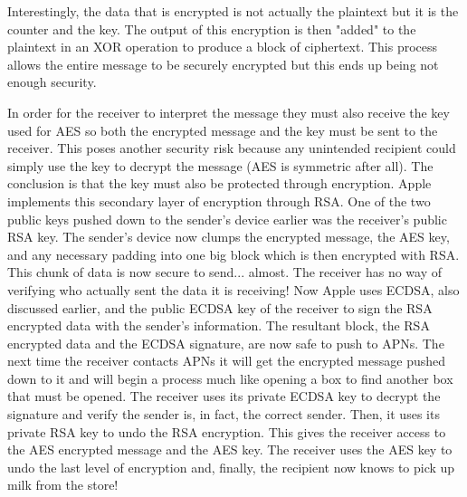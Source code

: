     Interestingly, the data that is encrypted is not actually the plaintext but it is the counter and the key.  The output of this encryption is then "added" to the plaintext in an XOR operation to produce a block of ciphertext.  This process allows the entire message to be securely encrypted but this ends up being not enough security.

    In order for the receiver to interpret the message they must also receive the key used for AES so both the encrypted message and the key must be sent to the receiver.  This poses another security risk because any unintended recipient could simply use the key to decrypt the message (AES is symmetric after all).  The conclusion is that the key must also be protected through encryption.  Apple implements this secondary layer of encryption through RSA.  One of the two public keys pushed down to the sender's device earlier was the receiver's public RSA key.  The sender's device now clumps the encrypted message, the AES key, and any necessary padding into one big block which is then encrypted with RSA.  This chunk of data is now secure to send... almost.  The receiver has no way of verifying who actually sent the data it is receiving!  Now Apple uses ECDSA, also discussed earlier, and the public ECDSA key of the receiver to sign the RSA encrypted data with the sender's information.  The resultant block, the RSA encrypted data and the ECDSA signature, are now safe to push to APNs.  The next time the receiver contacts APNs it will get the encrypted message pushed down to it and will begin a process much like opening a box to find another box that must be opened.  The receiver uses its private ECDSA key to decrypt the signature and verify the sender is, in fact, the correct sender.  Then, it uses its private RSA key to undo the RSA encryption.  This gives the receiver access to the AES encrypted message and the AES key.  The receiver uses the AES key to undo the last level of encryption and, finally, the recipient now knows to pick up milk from the store!
